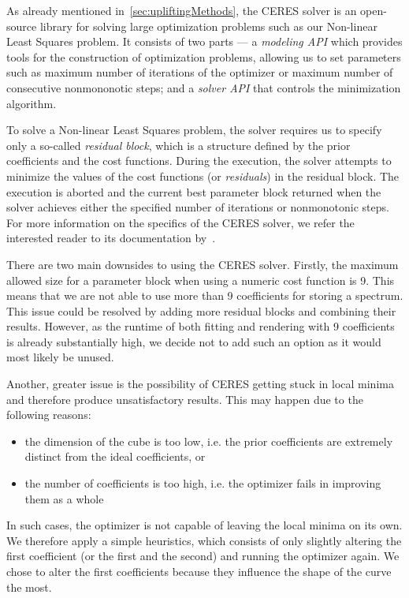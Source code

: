 As already mentioned in~\cref{sec:upliftingMethods}, the CERES solver is an open-source library for solving large optimization problems such as our Non-linear Least Squares problem. It consists of two parts --- a \emph{modeling API} which provides tools for the construction of optimization problems, allowing us to set parameters such as maximum number of iterations of the optimizer or maximum number of consecutive nonmononotic steps; and a \emph{solver API} that controls the minimization algorithm.

To solve a Non-linear Least Squares problem, the solver requires us to specify only a so-called \emph{residual block}, which is a structure defined by the prior coefficients and the cost functions. During the execution, the solver attempts to minimize the values of the cost functions (or \emph{residuals}) in the residual block. The execution is aborted and the current best parameter block returned when the solver achieves either the specified number of iterations or nonmonotonic steps. For more information on the specifics of the CERES solver, we refer the interested reader to its documentation by~\citet{ceresNonLinearLeastSquares}.

There are two main downsides to using the CERES solver. Firstly, the maximum allowed size for a parameter block when using a numeric cost function is 9. This means that we are not able to use more than 9 coefficients for storing a spectrum. This issue could be resolved by adding more residual blocks and combining their results. However, as the runtime of both fitting and rendering with 9 coefficients is already substantially high, we decide not to add such an option as it would most likely be unused.

Another, greater issue is the possibility of CERES getting stuck in local minima and therefore produce unsatisfactory results. This may happen due to the following reasons:
\begin{itemize} \label{ceresDeficiency}
	\item the dimension of the cube is too low, i.e. the prior coefficients are extremely distinct from the ideal coefficients, or
	\item the number of coefficients is too high, i.e. the optimizer fails in improving them as a whole
\end{itemize}
In such cases, the optimizer is not capable of leaving the local minima on its own. We therefore apply a simple heuristics, which consists of only slightly altering the first coefficient (or the first and the second) and running the optimizer again. We chose to alter the first coefficients because they influence the shape of the curve the most.

